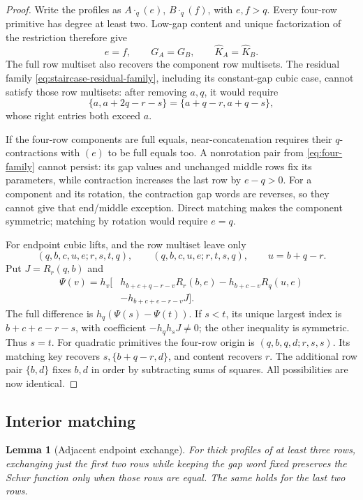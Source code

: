 \documentclass[11pt,a4paper]{amsart}
\numberwithin{equation}{section}
\theoremstyle{plain}
\newtheorem{lemma}[theorem]{Lemma}
\theoremstyle{definition}
\begin{document}
\begin{proof}
Write the profiles as \(A\cdot_q(e)\), \(B\cdot_q(f)\), with
\(e,f>q\).  Every four-row primitive has degree at least two.
Low-gap content and unique factorization of the restriction therefore
give
\[
 e=f,\qquad G_A=G_B,\qquad\widehat K_A=\widehat K_B.
\]
The full row multiset also recovers the component row multisets.
The residual family \eqref{eq:staircase-residual-family}, including its
constant-gap cubic case, cannot satisfy those row multisets: after
removing \(a,q\), it would require
\[
 \{a,a+2q-r-s\}=\{a+q-r,a+q-s\},
\]
whose right entries both exceed \(a\).

If the four-row components are full equals, near-concatenation requires
their \(q\)-contractions with \((e)\) to be full equals too.
A nonrotation pair from \eqref{eq:four-family} cannot persist: its gap
values and unchanged middle rows fix its parameters, while contraction
increases the last row by \(e-q>0\).  For a component and its rotation,
the contraction gap words are reverses, so they cannot give that
end/middle exception.  Direct matching makes the component symmetric;
matching by rotation would require \(e=q\).

For endpoint cubic lifts,
and the row multiset leave only
\[
 (q,b,c,u,e;r,s,t,q),\qquad
 (q,b,c,u,e;r,t,s,q),\qquad u=b+q-r.
\]
Put \(J=R_r(q,b)\) and
\begin{align*}
 \Psi(v)=h_v\bigl[&h_{b+c+q-r-v}R_r(b,e)
 -h_{b+c-v}R_q(u,e)\\
 &-h_{b+c+e-r-v}J\bigr].
\end{align*}
The full difference is \(h_q(\Psi(s)-\Psi(t))\).
If \(s<t\), its unique largest index is \(b+c+e-r-s\), with
coefficient \(-h_qh_sJ\ne0\); the other inequality is symmetric.
Thus \(s=t\).
For quadratic primitives the four-row origin is
\((q,b,q,d;r,s,s)\).  Its matching key recovers
\(s,\{b+q-r,d\}\), and content recovers \(r\).
The additional row pair \(\{b,d\}\) fixes \(b,d\) in order by
subtracting sums of squares.  All possibilities are now identical.
\end{proof}

\subsection{Interior matching}

\begin{lemma}[Adjacent endpoint exchange]\label{lem:staircase-adjacent-swap}
For thick profiles of at least three rows, exchanging just the first two
rows while keeping the gap word fixed preserves the Schur function only
when those rows are equal.  The same holds for the last two rows.
\end{lemma}
\end{document}
